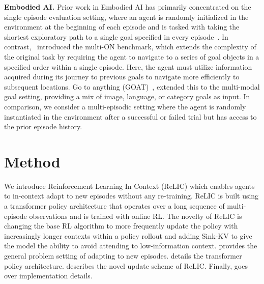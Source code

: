 \documentclass{article}
\newcommand{\Method}{Reinforcement Learning In Context \xspace}
\newcommand{\method}{ReLIC\xspace}
\newcommand{\sinkv}{Sink-KV\xspace}
\begin{document}
\textbf{Embodied AI.}
Prior work in Embodied AI has primarily concentrated on the single episode evaluation setting, where an agent is randomly initialized in the environment at the beginning of each episode and is tasked with taking the shortest exploratory path to a single goal specified in every episode~\citep{wijmans2019dd,yadav2022ovrl}. In contrast,~\cite{wani2020multion} introduced the multi-ON benchmark, which extends the complexity of the original task by requiring the agent to navigate to a series of goal objects in a specified order within a single episode. Here, the agent must utilize information acquired during its journey to previous goals to navigate more efficiently to subsequent locations. Go to anything (GOAT)~\citep{chang2023goat}, extended this to the multi-modal goal setting, providing a mix of image, language, or category goals as input. In comparison, we consider a multi-episodic setting where the agent is randomly instantiated in the environment after a successful or failed trial but has access to the prior episode history.
\vspace{-5pt}
\section{Method}
\vspace{-5pt}
We introduce \Method (\method) which enables agents to in-context adapt to new episodes without any re-training.
\method is built using a transformer policy architecture that operates over a long sequence of multi-episode observations and is trained with online RL.
The novelty of \method is changing the base RL algorithm to more frequently update the policy with increasingly longer contexts within a policy rollout and adding \sinkv to give the model the ability to avoid attending to low-information context.
 provides the general problem setting of adapting to new episodes.
 details the transformer policy architecture.
 describes the novel update scheme of \method.
Finally,  goes over implementation details.
\end{document}
